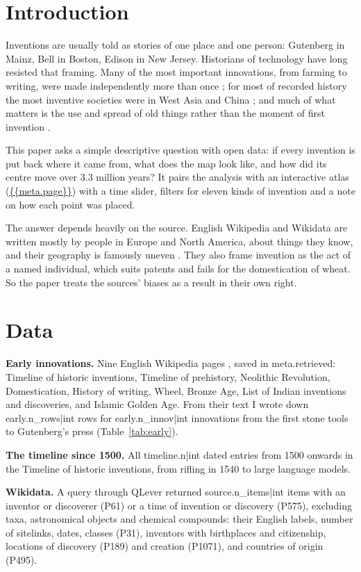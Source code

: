 \documentclass[11pt,a4paper]{article}
\begin{document}
\section{Introduction}
Inventions are usually told as stories of one place and one person: Gutenberg in Mainz, Bell in Boston, Edison in New Jersey. Historians of technology have long resisted that framing. Many of the most important innovations, from farming to writing, were made independently more than once \citep{diamond,larson}; for most of recorded history the most inventive societies were in West Asia and China \citep{needham,mokyr}; and much of what matters is the use and spread of old things rather than the moment of first invention \citep{edgerton}.

This paper asks a simple descriptive question with open data: if every invention is put back where it came from, what does the map look like, and how did its centre move over 3.3 million years? It pairs the analysis with an interactive atlas (\url{{{meta.page}}}) with a time slider, filters for eleven kinds of invention and a note on how each point was placed.

The answer depends heavily on the source. English Wikipedia and Wikidata \citep{wikidata} are written mostly by people in Europe and North America, about things they know, and their geography is famously uneven \citep{graham}. They also frame invention as the act of a named individual, which suits patents and fails for the domestication of wheat. So the paper treats the sources' biases as a result in their own right.

\section{Data}
\textbf{Early innovations.} Nine English Wikipedia pages \citep{wp}, saved in {{meta.retrieved}}: Timeline of historic inventions, Timeline of prehistory, Neolithic Revolution, Domestication, History of writing, Wheel, Bronze Age, List of Indian inventions and discoveries, and Islamic Golden Age. From their text I wrote down {{early.n_rows|int}} rows for {{early.n_innov|int}} innovations from the first stone tools to Gutenberg's press (Table~\ref{tab:early}).

\textbf{The timeline since 1500.} All {{timeline.n|int}} dated entries from 1500 onwards in the Timeline of historic inventions, from rifling in 1540 to large language models.

\textbf{Wikidata.} A query through QLever \citep{qlever} returned {{source.n_items|int}} items with an inventor or discoverer (P61) or a time of invention or discovery (P575), excluding taxa, astronomical objects and chemical compounds: their English labels, number of sitelinks, dates, classes (P31), inventors with birthplaces and citizenship, locations of discovery (P189) and creation (P1071), and countries of origin (P495).
\end{document}
